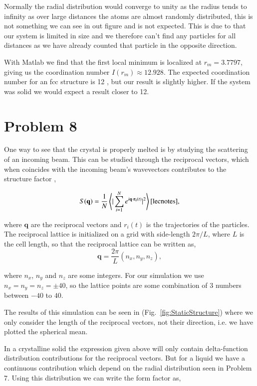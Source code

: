 Normally the radial distribution would converge to unity as the radius tends to infinity as over large distances the atoms are almost randomly distributed, this is not something we can see in out figure and is not expected. This is due to that our system is limited in size and we therefore can't find any particles for all distances as we have already counted that particle in the opposite direction.

With Matlab we find that the first local minimum is localized at $r_m = 3.7797$, giving us the coordination number $I(r_m) \approx 12.928$. The expected coordination number for an fcc structure is 12 \cite{al_coordination_nbr}, but our result is slightly higher. If the system was solid we would expect a result closer to 12.

\section*{Problem 8}

One way to see that the crystal is properly melted is by studying the scattering of an incoming beam. This can be studied through the reciprocal vectors, which when coincides with the incoming beam's wavevectors contributes to the structure factor \cite{kittel},

\begin{equation}
S(\mathbf{q})=\frac{1}{N}\left<|\sum_{i=1}^{N}e^{i\mathbf{q}\cdot \mathbf{r_i}(t)}|^2\right>\cite{lecnotes},
\end{equation}

where $\mathbf{q}$ are the reciprocal vectors and $r_i(t)$ is the trajectories of the particles. The reciprocal lattice is initialized on a grid with side-length $2\pi/L$, where $L$ is the cell length, so that the reciprocal lattice can be written as,
$$
	\mathbf{q}=\frac{2\pi}{L}(n_x,n_y,n_z),
$$

where $n_x$, $n_y$ and $n_z$ are some integers. For our simulation we use $n_x=n_y=n_z=\pm40$, so the lattice points are some combination of $3$ numbers between $-40$ to $40$.

The results of this simulation can be seen in (Fig.~\ref{fig:StaticStructure}) where we only consider the length of the reciprocal vectors, not their direction, i.e. we have plotted the spherical mean.

In a crystalline solid the expression given above will only contain delta-function distribution contributions for the reciprocal vectors. But for a liquid we have a continuous contribution which depend on the radial distribution seen in Problem 7. Using this distribution we can write the form factor as,

